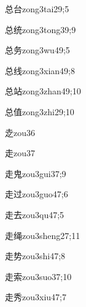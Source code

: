 \begin{verbete}{总台}{zong3tai2}{9;5}
\end{verbete}
\begin{verbete}{总统}{zong3tong3}{9;9}
\end{verbete}
\begin{verbete}{总务}{zong3wu4}{9;5}
\end{verbete}
\begin{verbete}{总线}{zong3xian4}{9;8}
\end{verbete}
\begin{verbete}{总站}{zong3zhan4}{9;10}
\end{verbete}
\begin{verbete}{总值}{zong3zhi2}{9;10}
\end{verbete}
\begin{verbete}{赱}{zou3}{6}
\end{verbete}
\begin{verbete}{走}{zou3}{7}
\end{verbete}
\begin{verbete}{走鬼}{zou3gui3}{7;9}
\end{verbete}
\begin{verbete}{走过}{zou3guo4}{7;6}
\end{verbete}
\begin{verbete}{走去}{zou3qu4}{7;5}
\end{verbete}
\begin{verbete}{走绳}{zou3sheng2}{7;11}
\end{verbete}
\begin{verbete}{走势}{zou3shi4}{7;8}
\end{verbete}
\begin{verbete}{走索}{zou3suo3}{7;10}
\end{verbete}
\begin{verbete}{走秀}{zou3xiu4}{7;7}
\end{verbete}
